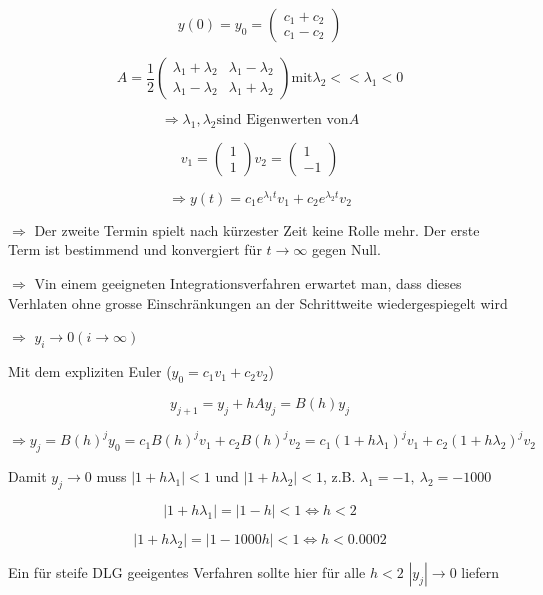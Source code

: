 \documentclass[10pt,a4paper]{article}
\begin{document}
\begin{bsp}[$y'=Ay$]

$$y(0)=y_0 = \begin{pmatrix}
c_1+c_2 \\ c_1-c_2
\end{pmatrix}
$$


$$  A= \frac{1}{2}
\begin{pmatrix}
\lambda_1+\lambda_2 & \lambda_1-\lambda_2 \\
\lambda_1-\lambda_2 & \lambda_1+\lambda_2
\end{pmatrix} \text{mit} \lambda_2 << \lambda_1 < 0
$$

$$\Rightarrow \lambda_1, \lambda_2 \text{sind Eigenwerten von} A$$

$$
v_1=\begin{pmatrix}
1 \\ 1
\end{pmatrix}
v_2=\begin{pmatrix}
1 \\ -1
\end{pmatrix}
$$

$$
\Rightarrow y(t)=c_1 e^{\lambda_1 t} v_1 + c_2 e^{\lambda_2 t} v_2
$$

$\Rightarrow$ Der zweite Termin spielt nach kürzester Zeit keine Rolle mehr. Der erste Term ist bestimmend und konvergiert für $t \rightarrow \infty$ gegen Null.

$\Rightarrow$ Vin einem geeigneten Integrationsverfahren erwartet man, dass dieses Verhlaten ohne grosse Einschränkungen an der Schrittweite wiedergespiegelt wird

$\Rightarrow$ $y_i \rightarrow 0 (i \rightarrow \infty)$

Mit dem expliziten Euler ($y_0 = c_1 v_1 + c_2 v_2$)


$$y_{j+1} = y_j + hAy_j=B(h)y_j$$

$$\Rightarrow y_j = B(h)^{j}y_0 = c_1 B(h)^{j}v_1 + c_2 B(h)^{j}v_2 = c_1 (1+h\lambda_1)^{j}v_1 + c_2 (1+h\lambda_2)^{j}v_2$$

Damit $y_j \rightarrow 0$ muss $|1+h\lambda_1|<1$ und $|1+h\lambda_2|<1$, z.B. $\lambda_1 = -1, ~ \lambda_2=-1000$

$$ |1+h\lambda_1| = |1-h|<1 \Leftrightarrow h < 2$$

$$ |1+h\lambda_2| = |1-1000h|<1 \Leftrightarrow h < 0.0002$$

Ein für steife DLG geeigentes Verfahren sollte hier für alle $h<2$ $|y_j|\rightarrow 0$ liefern
\end{bsp}
\end{document}
